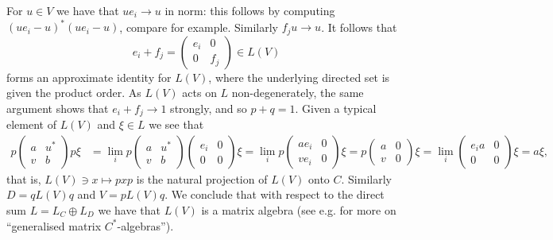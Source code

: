 \documentclass[a4paper,11pt]{article}
\theoremstyle{plain}
\theoremstyle{remark}
\begin{document}
For $u\in V$ we have that $ue_i\to u$ in norm: this follows by computing $(ue_i-u)^*(ue_i-u)$, compare \cite[(1.5)]{Lance_HilbModsBook} for example.  Similarly $f_ju\to u$.  It follows that
\[ e_i + f_j = \begin{pmatrix} e_i & 0 \\ 0 & f_j \end{pmatrix} \in L(V) \]
forms an approximate identity for $L(V)$, where the underlying directed set is given the product order.  As $L(V)$ acts on $L$ non-degenerately, the same argument shows that $e_i+f_j \to 1$ strongly, and so $p+q=1$.  Given a typical element of $L(V)$ and $\xi\in L$ we see that
\begin{align*} p \begin{pmatrix} a & u^* \\ v & b \end{pmatrix} p \xi
&= \lim_i p \begin{pmatrix} a & u^* \\ v & b \end{pmatrix} \begin{pmatrix} e_i & 0 \\ 0 & 0 \end{pmatrix} \xi
= \lim_i p \begin{pmatrix} ae_i & 0 \\ ve_i & 0 \end{pmatrix}\xi
= p \begin{pmatrix} a & 0 \\ v & 0 \end{pmatrix}\xi 
= \lim_i \begin{pmatrix} e_i a & 0 \\ 0 & 0 \end{pmatrix}\xi
= a \xi,
\end{align*}
that is, $L(V) \ni x \mapsto pxp$ is the natural projection of $L(V)$ onto $C$.  Similarly $D = qL(V)q$ and $V = pL(V)q$.  We conclude that with respect to the direct sum $L = L_C \oplus L_D$ we have that $L(V)$ is a matrix algebra (see e.g.\@ \cite{Skeide_matrix_cstar_algs} for more on ``generalised matrix $C^*$-algebras'').
\end{document}
